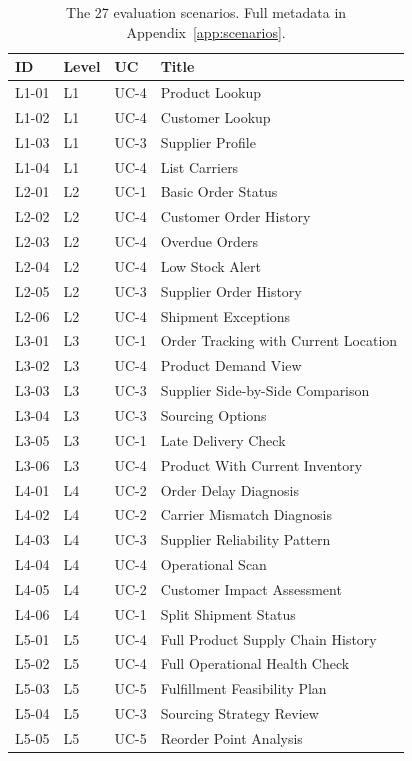 \begin{table}[H]
    \centering\scriptsize
    \begin{tabularx}{\textwidth}{|l|l|l|X|}
        \hline
        \rowcolor{lightgray}
        \textbf{ID} & \textbf{Level} & \textbf{UC} & \textbf{Title} \\
        \hline
        L1-01 & L1 & UC-4 & Product Lookup \\ \hline
        L1-02 & L1 & UC-4 & Customer Lookup \\ \hline
        L1-03 & L1 & UC-3 & Supplier Profile \\ \hline
        L1-04 & L1 & UC-4 & List Carriers \\ \hline
        L2-01 & L2 & UC-1 & Basic Order Status \\ \hline
        L2-02 & L2 & UC-4 & Customer Order History \\ \hline
        L2-03 & L2 & UC-4 & Overdue Orders \\ \hline
        L2-04 & L2 & UC-4 & Low Stock Alert \\ \hline
        L2-05 & L2 & UC-3 & Supplier Order History \\ \hline
        L2-06 & L2 & UC-4 & Shipment Exceptions \\ \hline
        L3-01 & L3 & UC-1 & Order Tracking with Current Location \\ \hline
        L3-02 & L3 & UC-4 & Product Demand View \\ \hline
        L3-03 & L3 & UC-3 & Supplier Side-by-Side Comparison \\ \hline
        L3-04 & L3 & UC-3 & Sourcing Options \\ \hline
        L3-05 & L3 & UC-1 & Late Delivery Check \\ \hline
        L3-06 & L3 & UC-4 & Product With Current Inventory \\ \hline
        L4-01 & L4 & UC-2 & Order Delay Diagnosis \\ \hline
        L4-02 & L4 & UC-2 & Carrier Mismatch Diagnosis \\ \hline
        L4-03 & L4 & UC-3 & Supplier Reliability Pattern \\ \hline
        L4-04 & L4 & UC-4 & Operational Scan \\ \hline
        L4-05 & L4 & UC-2 & Customer Impact Assessment \\ \hline
        L4-06 & L4 & UC-1 & Split Shipment Status \\ \hline
        L5-01 & L5 & UC-4 & Full Product Supply Chain History \\ \hline
        L5-02 & L5 & UC-4 & Full Operational Health Check \\ \hline
        L5-03 & L5 & UC-5 & Fulfillment Feasibility Plan \\ \hline
        L5-04 & L5 & UC-3 & Sourcing Strategy Review \\ \hline
        L5-05 & L5 & UC-5 & Reorder Point Analysis \\ \hline
    \end{tabularx}
    \caption{The 27 evaluation scenarios. Full metadata in Appendix~\ref{app:scenarios}.}
    \label{tab:scenarios}
\end{table}

